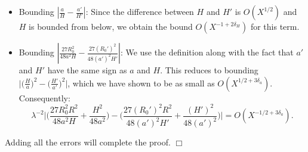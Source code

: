 \documentclass{article}
\newenvironment{proof}{\noindent {\bf Proof:}}{$\Box$ \vspace{2 ex}}
\begin{document}
\begin{proof}
\begin{itemize}
Secondly, we examine
\begin{equation*}
\Big| |a'| |H|^{1/2} \sqrt{X + \frac{H^2}{48a^2}} - |a'| |H'|^{1/2} \sqrt{X + \frac{H^2}{48a^2}} \Big|.
\end{equation*}
This term is $O(X^{1 + \delta_H/2 + 2\delta_a})$ because $H$ and $H'$ have the same sign, and we have the constraints $|H - H'| = O(X^{1/2})$ and $|H| > X^{1 - \delta_H}$. This bound follows directly from these constraints.

Finally, we consider the term
\begin{equation*}
\Big| |a'| |H'|^{1/2} \sqrt{X + \frac{H^2}{48a^2}} - |a'| |H'|^{1/2} \sqrt{X + \frac{(H')^2}{48(a')^2}} \Big|.
\end{equation*}
Our goal is to show that this difference is also small. Using the Mean Value Theorem, we know that $|(H/a)^2 - (H'/a')^2| = O(X^{1/2 + 3\delta_a})$, which implies that this term is bounded by $O(X^{1 + 3\delta_a})$.

In summary, each of the three terms is bounded, resulting in a total error of $O(X^{-1/2 + 3\delta_a+\delta_H+6\delta_t})$ for $|(R_0-R_0')t^6\lambda^{-3}|$.
\item Bounding $ \left| \frac{a}{H} - \frac{a'}{H'} \right|$: Since the difference between $H$ and $H'$ is $O(X^{1/2})$ and $H$ is bounded from below, we obtain the bound $O(X^{-1+2\delta_H})$ for this term.
    
\item Bounding $ \left| \frac{27 R_0^2}{48 a^2 H} - \frac{27 (R_0')^2}{48 (a')^2 H'} \right|$: We use the definition along with the fact that $a'$ and $H'$ have the same sign as $a$ and $H$. This reduces to bounding $ \Big| \Big(\frac{H}{a}\Big)^2 - \Big(\frac{H'}{a'}\Big)^2 \Big|$, which we have shown to be as small as $O(X^{1/2+3\delta_a})$. Consequently:
    \begin{equation*}
        \lambda^{-2} \Big| \Big( \frac{27 R_0^2 R^2}{48 a^2 H} + \frac{H^2}{48 a^2} \Big) - \Big( \frac{27 (R_0')^2 R^2}{48 (a')^2 H'} + \frac{(H')^2}{48 (a')^2} \Big) \Big| = O(X^{-1/2+3\delta_a}).
    \end{equation*}
\end{itemize}
Adding all the errors will complete the proof.
\end{proof}
\end{document}
